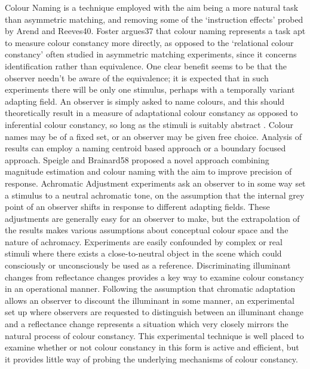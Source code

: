 Colour Naming is a technique employed with the aim being a more natural task than  asymmetric matching, and removing some of the `instruction effects' probed by Arend and Reeves40. Foster argues37 that colour naming represents a task apt to measure colour constancy more directly, as opposed to the `relational colour constancy' often studied in asymmetric matching experiments, since it concerns identification rather than equivalence. One clear benefit seems to be that the observer needn't be aware of the equivalence; it is expected that in such experiments there will be only one stimulus, perhaps with a temporally variant adapting field. An observer is simply asked to name colours, and this should theoretically result in a measure of adaptational colour constancy as opposed to inferential colour constancy, so long as the stimuli is suitably abstract . Colour names may be of a fixed set, or an observer may be given free choice. Analysis of results can employ a naming centroid based approach or a boundary focused approach. Speigle and Brainard58 proposed a novel approach combining magnitude estimation and colour naming with the aim to improve precision of response.
Achromatic Adjustment experiments ask an observer to in some way set a stimulus to a neutral achromatic tone, on the assumption that the internal grey point of an observer shifts in response to different adapting fields. These adjustments are generally easy for an observer to make, but the extrapolation of the results makes various assumptions about conceptual colour space and the nature of achromacy. Experiments are easily confounded by complex or real stimuli where there exists a close-to-neutral object in the scene which could consciously or unconsciously be used as a reference.
Discriminating illuminant changes from reflectance changes provides a key way to examine colour constancy in an operational manner. Following the assumption that chromatic adaptation allows an observer to discount the illuminant in some manner, an experimental set up where observers are requested to distinguish between an illuminant change and a reflectance change represents a situation which very closely mirrors the natural process of colour constancy. This experimental technique is well placed to examine whether or not colour constancy in this form is active and efficient, but it provides little way of probing the underlying mechanisms of colour constancy.


